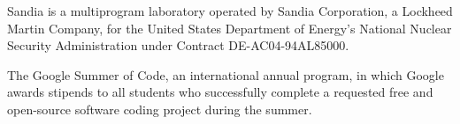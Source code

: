 Sandia is a multiprogram laboratory operated by Sandia Corporation, a Lockheed Martin Company, for the United States Department of Energy's National Nuclear Security Administration under Contract DE-AC04-94AL85000.

The Google Summer of Code, an international annual program, in which Google awards stipends to all students who successfully complete a requested free and open-source software coding project during the summer.
